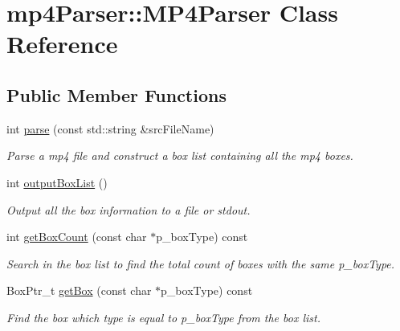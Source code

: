 \hypertarget{classmp4_parser_1_1_m_p4_parser}{}\section{mp4\+Parser\+::M\+P4\+Parser Class Reference}
\label{classmp4_parser_1_1_m_p4_parser}
\subsection*{Public Member Functions}
\begin{DoxyCompactItemize}
\item 
int \mbox{\hyperlink{classmp4_parser_1_1_m_p4_parser_ab91eea9d61232b6db52eda81c65e8ad4}{parse}} (const std\+::string \&src\+File\+Name)
\begin{DoxyCompactList}\small\item\em Parse a mp4 file and construct a box list containing all the mp4 boxes. \end{DoxyCompactList}\item 
int \mbox{\hyperlink{classmp4_parser_1_1_m_p4_parser_aded5fb465d00d6a7cdde6fa276615c49}{output\+Box\+List}} ()
\begin{DoxyCompactList}\small\item\em Output all the box information to a file or stdout. \end{DoxyCompactList}\item 
\mbox{\label{classmp4_parser_1_1_m_p4_parser_a8ab5c7cd064c87f91b56d5f9cc3df6ae}} 
int \mbox{\hyperlink{classmp4_parser_1_1_m_p4_parser_a8ab5c7cd064c87f91b56d5f9cc3df6ae}{get\+Box\+Count}} (const char $\ast$p\+\_\+box\+Type) const
\begin{DoxyCompactList}\small\item\em Search in the box list to find the total count of boxes with the same p\+\_\+box\+Type. \end{DoxyCompactList}\item 
Box\+Ptr\+\_\+t \mbox{\hyperlink{classmp4_parser_1_1_m_p4_parser_a01d96e45863265af62744aa0176ba13f}{get\+Box}} (const char $\ast$p\+\_\+box\+Type) const
\begin{DoxyCompactList}\small\item\em Find the box which type is equal to p\+\_\+box\+Type from the box list. \end{DoxyCompactList}\item 
\mbox{\label{classmp4_parser_1_1_m_p4_parser_a3ca2c14303ef53c0e3a2abe72d22c017}} 

\end{DoxyCompactItemize}
